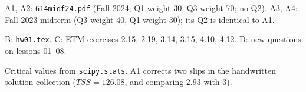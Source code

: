 \begin{transcriptnotes}
  \item A1, A2: \texttt{614midf24.pdf} (Fall 2024; Q1 weight 30, Q3 weight 70; no Q2). A3, A4: Fall 2023 midterm (Q3 weight 40, Q1 weight 30); its Q2 is identical to A1.
  \item B: \texttt{hw01.tex}. C: ETM exercises 2.15, 2.19, 3.14, 3.15, 4.10, 4.12. D: new questions on lessons 01--08.
  \item Critical values from \texttt{scipy.stats}. A1 corrects two slips in the handwritten solution collection ($TSS=126.08$, and comparing $2.93$ with $3$).
\end{transcriptnotes}


